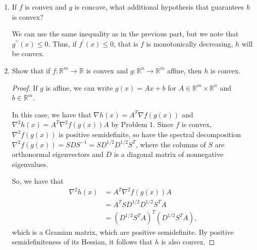 \documentclass[11pt]{amsart}
\begin{document}
\begin{enumerate}
\begin{enumerate}
  With certain conditions, we can ensure that $h$ is convex. $h$ is convex if
  and only if
  $f^\prime\left(g(x)\right)g^{\prime\prime}(x) \geq
  -f^{\prime\prime}\left(g(x)\right)\left[g^\prime(x)\right]^2$ for all $x$.
  \begin{proof}
    We have that
    $h^{\prime\prime}(x) = f^\prime\left(g(x)\right)g^{\prime\prime}(x) +
    f^{\prime\prime}\left(g(x)\right)\left[g^\prime(x)\right]^2$, so
    \begin{equation*}
      \text{$h$ is convex} \Leftrightarrow
      h^{\prime\prime}(x) \geq 0 \Leftrightarrow
      f^\prime\left(g(x)\right)g^{\prime\prime}(x) \geq
      -f^{\prime\prime}\left(g(x)\right)\left[g^\prime(x)\right]^2
    \end{equation*}
  \end{proof}
  
  Since $f$ and $g$ are convex, we have that
  $f^{\prime\prime}\left(g(x)\right)\left[g^\prime(x)\right]^2 \geq 0$ and
  $g^{\prime\prime}(x) \geq 0$. Thus, one way to ensure that this inequality
  holds is for $f^\prime(x) \geq 0$, that is, for $f$ to be monotonically
  increasing.
  
\item If $f$ is convex and $g$ is concave, what additional hypothesis that guarantees $h$ is convex?

  We can use the same inequality as in the previous part, but we note that
  $g^{\prime\prime}(x) \leq 0$. Thus, if $f^\prime(x) \leq 0$, that is $f$ is
  monotonically decreasing, $h$ will be convex.

\item Show that if $f: \mathbb{R}^m \rightarrow \mathbb{R}$ is convex and $g: \mathbb{R}^n \rightarrow \mathbb{R}^m$ affine, then $h$ is convex.

  \begin{proof}
    If $g$ is affine, we can write $g(x) = Ax + b$ for
    $A \in \mathbb{R}^m \times \mathbb{R}^n$ and $b \in \mathbb{R}^m$.
    
    In this case, we have that $\nabla h(x) = A^T\nabla f(g(x))$ and
    $\nabla^2 h(x) = A^T \nabla^2 f(g(x)) A$ by Problem 1. Since $f$ is convex,
    $\nabla^2 f(g(x))$ is positive semidefinite, so have the spectral
    decomposition $\nabla^2 f(g(x)) = SDS^{-1} = SD^{1/2}D^{1/2}S^T$, where the
    columns of $S$ are orthonormal eigenvectors and $D$ is a diagonal matrix of
    nonnegative eigenvalues.

    So, we have that
    \begin{align*}
      \nabla^2 h(x)
      &= A^T \nabla^2 f(g(x)) A \\
      &= A^TSD^{1/2}D^{1/2}S^TA \\
      &= \left(D^{1/2}S^TA\right)^T\left(D^{1/2}S^TA\right),
    \end{align*}
    which is a Gramian matrix, which are positive semidefinite. By positive
    semidefiniteness of its Hessian, it follows that $h$ is also convex.
  \end{proof}
  

\end{enumerate}
\end{enumerate}
\end{document}
